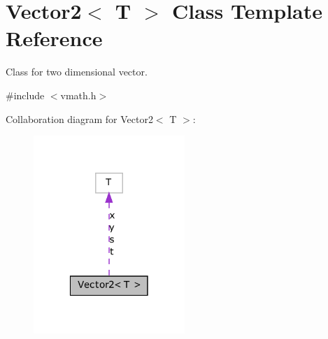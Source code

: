 \hypertarget{class_vector2}{
\section{Vector2$<$ T $>$ Class Template Reference}
\label{class_vector2}
}


Class for two dimensional vector.  




{\ttfamily \#include $<$vmath.h$>$}



Collaboration diagram for Vector2$<$ T $>$:\nopagebreak
\begin{figure}[H]
\begin{center}
\leavevmode
\includegraphics[width=162pt]{class_vector2__coll__graph}
\end{center}
\end{figure}
